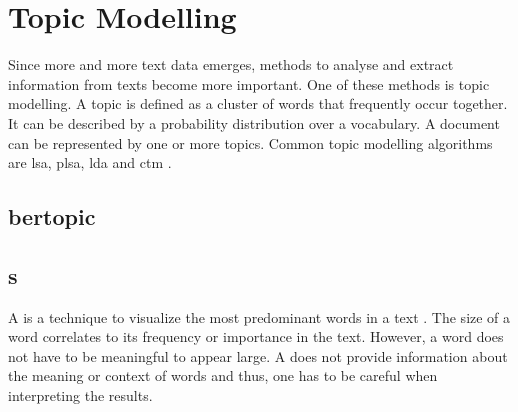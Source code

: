 \section{Topic Modelling}\label{sec:topic-modelling}

Since more and more text data emerges, methods to analyse and extract information from texts become more important.
One of these methods is topic modelling.
A topic is defined as a cluster of words that frequently occur together.
It can be described by a probability distribution over a vocabulary.
A document can be represented by one or more topics. %
Common topic modelling algorithms are \ac{lsa}, \ac{plsa}, \ac{lda} and \ac{ctm} \cite{topic_modeling2015}.




\subsection{\ac{bertopic}}\label{subsec:bertopic}







\subsection{\wordcloud{}s}\label{subsec:word-clouds}

A \wordcloud{} is a technique to visualize the most predominant words in a text \cite{topic_modeling2019}.
The size of a word correlates to its frequency or importance in the text.
However, a word does not have to be meaningful to appear large.
A \wordcloud{} does not provide information about the meaning or context of words and thus, 
one has to be careful when interpreting the results.